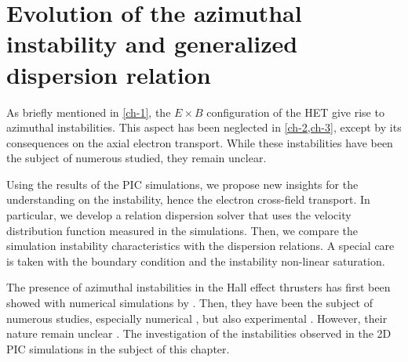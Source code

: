 



\chapter{Evolution of the azimuthal instability and generalized dispersion relation}
\label{ch-5}

\begin{Chabstract}
  
As briefly mentioned in \cref{ch-1}, the $E \times B$ configuration of the \ac{HET} give rise to azimuthal instabilities.
This aspect has been neglected in \cref{ch-2,ch-3}, except by its consequences on the axial electron transport.
While these instabilities have been the subject of numerous studied, they remain unclear.

Using the results of the \ac{PIC} simulations, we propose new insights for the understanding on the instability, hence the electron cross-field transport.
In particular, we develop a relation dispersion solver that uses the velocity distribution function measured in the simulations.
Then, we compare the simulation instability characteristics with the dispersion relations.
A special care is taken with the boundary condition and the instability non-linear saturation. 
\end{Chabstract}

% 
% 

\minitoc


The presence of azimuthal instabilities in the Hall effect thrusters has first been showed with numerical simulations by \citet{adam2004}.
Then, they have been the subject of numerous studies, especially numerical \citep{ducrocq2006,lafleur2016,lafleur2016a,croes2017,croes2018,janhunen2018,taccogna2019}, but also experimental \citep{honore2011,cavalier2013,cavalier2013a}.
However, their nature remain unclear \citep{boeuf2018}.
The investigation of the instabilities observed in the \ac{2D} \ac{PIC} simulations in the subject of this chapter.

